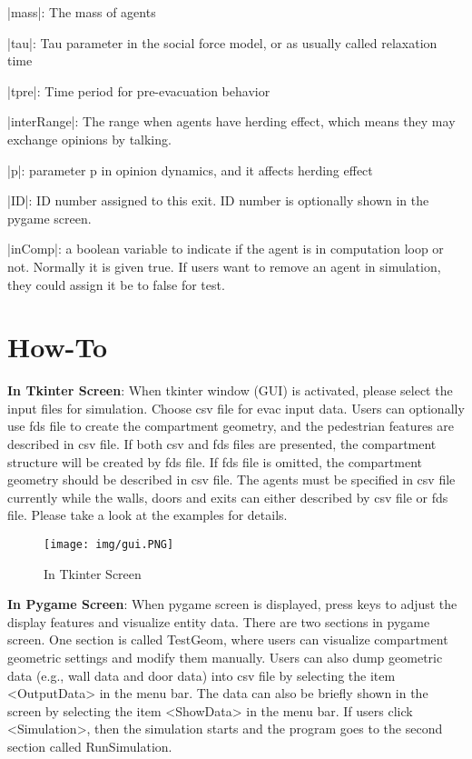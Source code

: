 \documentclass[english]{article}
\begin{document}
|mass|: The mass of agents

|tau|: Tau parameter in the social force model, or as usually called
relaxation time

|tpre|: Time period for pre-evacuation behavior

|interRange|: The range when agents have herding effect, which means
they may exchange opinions by talking. 

|p|: parameter p in opinion dynamics, and it affects herding effect

|ID|: ID number assigned to this exit. ID number is optionally shown
in the pygame screen. 

|inComp|: a boolean variable to indicate if the agent is in computation
loop or not. Normally it is given true. If users want to remove an
agent in simulation, they could assign it be to false for test.

\section{How-To}

\textbf{In Tkinter Screen}: When tkinter window (GUI) is activated,
please select the input files for simulation. Choose csv file for
evac input data. Users can optionally use fds file to create the compartment
geometry, and the pedestrian features are described in csv file. If
both csv and fds files are presented, the compartment structure will
be created by fds file. If fds file is omitted, the compartment geometry
should be described in csv file. The agents must be specified in csv
file currently while the walls, doors and exits can either described
by csv file or fds file. Please take a look at the examples for details.

\begin{figure}[tb]
\centerline{\texttt{[image: img/gui.PNG]}} \caption{In Tkinter Screen}

\label{Fig_TkScreen} 
\end{figure}

\noindent \textbf{In Pygame Screen}: When pygame screen is displayed,
press keys to adjust the display features and visualize entity data.
There are two sections in pygame screen. One section is called TestGeom,
where users can visualize compartment geometric settings and modify
them manually. Users can also dump geometric data (e.g., wall data
and door data) into csv file by selecting the item <OutputData> in
the menu bar. The data can also be briefly shown in the screen by
selecting the item <ShowData> in the menu bar. If users click <Simulation>,
then the simulation starts and the program goes to the second section
called RunSimulation. 
\end{document}
